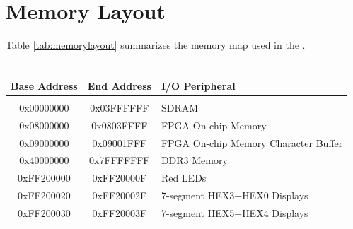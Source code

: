 \section{Memory Layout}

\noindent
Table \ref{tab:memorylayout} summarizes the memory map used in the \systemName.
~\\
~\\

\begin{table}[h]
    \begin{center}
    \begin{tabular}{c|c|l}
            \textbf{Base Address}
            & \textbf{End Address}
            & \textbf{I/O Peripheral}
				\\\hline\vspace{-3mm}\\
            0x00000000
            & 0x03FFFFFF
            & SDRAM
        \\
            0x08000000
            & 0x0803FFFF
            & FPGA On-chip Memory
        \\
            0x09000000
            & 0x09001FFF
            & FPGA On-chip Memory Character Buffer
        \\
            0x40000000
            & 0x7FFFFFFF
            & DDR3 Memory
        \\
            0xFF200000
            & 0xFF20000F
            & Red LEDs
        \\
            0xFF200020
            & 0xFF20002F
            & 7-segment HEX3$-$HEX0 Displays
        \\
            0xFF200030
            & 0xFF20003F
            & 7-segment HEX5$-$HEX4 Displays


\end{tabular}
\end{center}
\end{table}
